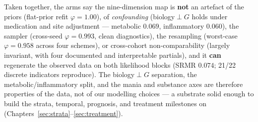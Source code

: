 \begin{keyresult}
Taken together, the arms say the nine-dimension map is \textbf{not} an artefact of the priors (flat-prior refit
$\varphi=1.00$), of \emph{confounding} (biology$\perp$$G$ holds under medication and site adjustment --- metabolic
$0.069$, inflammatory $0.060$), the sampler (cross-seed $\varphi=0.993$, clean diagnostics), the resampling
(worst-case $\varphi=0.958$ across four schemes), or cross-cohort non-comparability (largely invariant, with four
documented and interpretable partials), and it \textbf{can} regenerate the observed data on both likelihood blocks
(SRMR $0.074$; 21/22 discrete indicators reproduce). The biology$\perp$$G$ separation, the metabolic/inflammatory
split, and the mania and substance axes are therefore properties of the data, not of our modelling choices ---
a substrate solid enough to build the strata, temporal, prognosis, and treatment milestones on
(Chapters~\ref{sec:strata}--\ref{sec:treatment}).
\end{keyresult}
